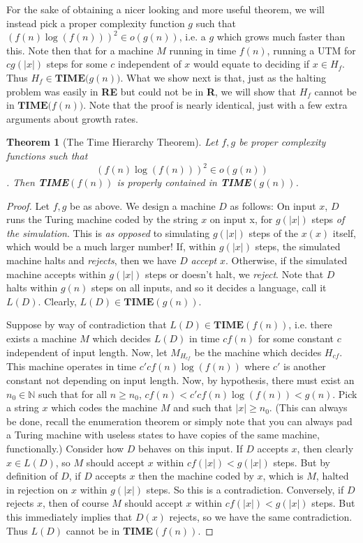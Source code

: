 \documentclass{article}
\theoremstyle{definition}
\theoremstyle{plain}
\theoremstyle{theorem}
\newtheorem{theorem}{Theorem}[section]
\begin{document}
\par For the sake of obtaining a nicer looking and more useful theorem, we will instead pick a proper complexity function $g$ such that $(f(n)\log(f(n)))^2 \in o(g(n))$, i.e. a $g$ which grows much faster than this. Note then that for a machine $M$ running in time $f(n)$, running a UTM for $cg(|x|)$ steps for some $c$ independent of $x$ would equate to deciding if $x \in H_f$. Thus $H_f \in \textbf{TIME($g(n)$)}$. What we show next is that, just as the halting problem was easily in \textbf{RE} but could not be in \textbf{R}, we will show that $H_f$ cannot be in $\textbf{TIME($f(n)$)}$. Note that the proof is nearly identical, just with a few extra arguments about growth rates.
\begin{theorem}[The Time Hierarchy Theorem]
	Let $f,g$ be proper complexity functions such that \[ (f(n)\log(f(n)))^2 \in o(g(n)) \]. Then \textbf{TIME}$(f(n))$ is \textit{properly} contained in \textbf{TIME}$(g(n))$.
\end{theorem} 
\begin{proof}
	Let $f,g$ be as above. We design a machine $D$ as follows: On input $x$, $D$ runs the Turing machine coded by the string $x$ on input x, for $g(|x|)$ steps \textit{of the simulation}. This is \textit{as opposed} to simulating $g(|x|)$ steps of the $x(x)$ itself, which would be a much larger number! If, within $g(|x|)$ steps, the simulated machine halts and \textit{rejects}, then we have $D$ \textit{accept} $x$. Otherwise, if the simulated machine accepts within $g(|x|)$ steps or doesn't halt, we \textit{reject}. Note that $D$ halts within $g(n)$ steps on all inputs, and so it decides a language, call it $L(D)$. Clearly, $L(D) \in \textbf{TIME}(g(n))$. 
	\par Suppose by way of contradiction that $L(D) \in \textbf{TIME}(f(n))$, i.e. there exists a machine $M$ which decides $L(D)$ in time $cf(n)$ for some constant $c$ independent of input length. 
	Now, let $M_{H_{cf}}$ be the machine which decides $H_{cf}$. This machine operates in time $c'cf(n)\log(f(n))$ where $c'$ is another constant not depending on input length. 
	Now, by hypothesis, there must exist an $n_0 \in \mathbb{N}$ such that for all $n \geq n_0$, $cf(n) < c'cf(n)\log(f(n)) < g(n)$. Pick a string $x$ which codes the machine $M$ and such that $|x| \geq n_0$. (This can always be done, recall the enumeration theorem or simply note that you can always pad a Turing machine with useless states to have copies of the same machine, functionally.) Consider how $D$ behaves on this input.
	 If $D$ accepts $x$, then clearly $x \in L(D)$, so $M$ should accept $x$ within $cf(|x|) < g(|x|)$ steps. But by definition of $D$, if $D$ accepts $x$ then the machine coded by $x$, which is $M$, halted in rejection on $x$ within $g(|x|)$ steps. So this is a contradiction. Conversely, if $D$ rejects $x$, then of course $M$ should accept $x$ within $cf(|x|) < g(|x|)$ steps. But this immediately implies that $D(x)$ rejects, so we have the same contradiction. Thus $L(D)$ cannot be in \textbf{TIME}$(f(n))$.
\end{proof}
\end{document}
